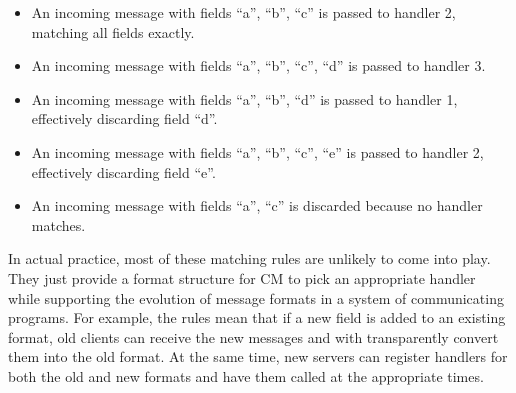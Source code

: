 \documentclass[11pt]{article}
\begin{document}
\begin{description}
\begin{itemize}
\item An incoming message with fields ``a'', ``b'', ``c'' is passed to
handler 2, matching all fields exactly.
\item An incoming message with fields ``a'', ``b'', ``c'', ``d'' is passed
to handler 3.
\item An incoming message with fields ``a'', ``b'', ``d'' is passed to
handler 1, effectively discarding field ``d''.
\item An incoming message with fields ``a'', ``b'', ``c'', ``e'' is passed to
handler 2, effectively discarding field ``e''.
\item An incoming message with fields ``a'', ``c'' is discarded because no
handler matches.
\end{itemize}

In actual practice, most of these matching rules are unlikely to come into
play.  They just provide a format structure for CM to pick an appropriate
handler while supporting the evolution of message formats in a system of
communicating programs.  For example, the rules mean that if a new field is
added to an existing format, old clients can receive the new messages and
with transparently convert them into the old format.  At the same time, new
servers can register handlers for both the old and new formats and have them
called at the appropriate times.


\end{description}
\end{document}
